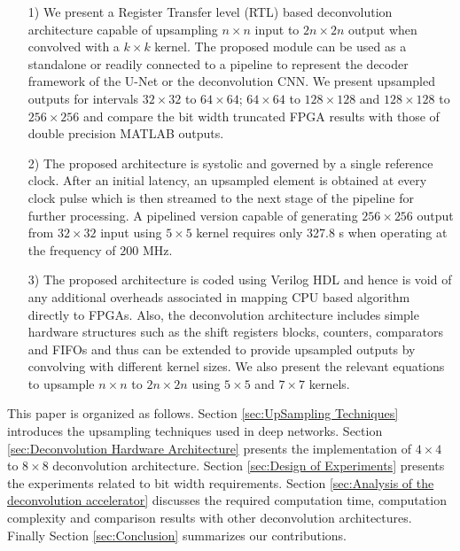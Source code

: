 \documentclass[journal]{IEEEtran}
\begin{document}
\begin{itemize}[leftmargin=*]
    \item[1)] We present a Register Transfer level (RTL) based deconvolution architecture capable of upsampling $n \times n$ input to $2n \times 2n$ output when convolved with a $k \times k$ kernel. The proposed module can be used as a standalone or readily connected to a pipeline to represent the decoder framework of the U-Net or the deconvolution CNN. We present upsampled outputs for intervals $32 \times 32 $ to $ 64 \times 64$; $64 \times 64 $ to $ 128 \times 128$ and $128 \times 128$  to $256 \times 256$ and compare the bit width truncated FPGA results with those of double precision MATLAB outputs.
    \item[2)] The proposed architecture is systolic and governed by a single reference clock. After an initial latency, an upsampled element is obtained at every clock pulse which is then streamed to the next stage of the pipeline for further processing. A pipelined version capable of generating $256\times256$ output from $32\times32$ input using $5\times5$ kernel requires only 327.8 \textmu s when operating at the frequency of $200$ MHz.
    \item[3)] The proposed architecture is coded using Verilog HDL and hence is void of any additional overheads associated in mapping CPU based algorithm directly to FPGAs. Also, the deconvolution architecture includes simple hardware structures such as the shift registers blocks, counters, comparators and FIFOs and thus can be extended to provide upsampled outputs by convolving with different kernel sizes. We also present the relevant equations to upsample $n \times n$ to $2n \times 2n$ using $5 \times 5$ and $7 \times 7$ kernels. 
\end{itemize}




This paper is organized as follows. Section \ref{sec:UpSampling Techniques} introduces the upsampling techniques used in deep networks. Section \ref{sec:Deconvolution Hardware Architecture} presents the implementation of $4\times4$ to $8\times8$ deconvolution architecture. Section \ref{sec:Design of Experiments} presents the experiments related to bit width requirements. Section \ref{sec:Analysis of the deconvolution accelerator} discusses the required computation time, computation complexity and comparison results with other deconvolution architectures.  Finally Section \ref{sec:Conclusion} summarizes our contributions.


\end{document}
